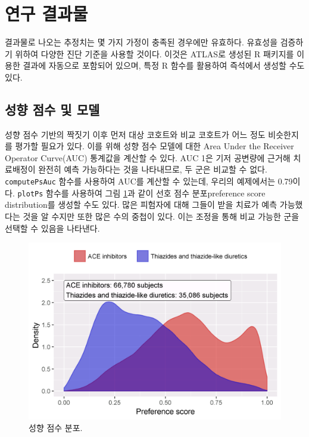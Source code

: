 \documentclass[10.5pt]{book}
\theoremstyle{definition}
\theoremstyle{definition}
\theoremstyle{definition}
\theoremstyle{remark}
\begin{document}
\section{연구 결과물}\label{studyOutputs}

결과물로 나오는 추정치는 몇 가지 가정이 충족된 경우에만 유효하다.
유효성을 검증하기 위하여 다양한 진단 기준을 사용할 것이다. 이것은
ATLAS로 생성된 R 패키지를 이용한 결과에 자동으로 포함되어 있으며, 특정 R
함수를 활용하여 즉석에서 생성할 수도 있다.

\subsection{성향 점수 및 모델}\label{---}

성향 점수 기반의 짝짓기 이후 먼저 대상 코호트와 비교 코호트가 어느 정도
비슷한지를 평가할 필요가 있다. 이를 위해 성향 점수 모델에 대한 Area
Under the Receiver Operator Curve(AUC) 통계값을 계산할 수 있다. AUC 1은
기저 공변량에 근거해 치료배정이 완전히 예측 가능하다는 것을 나타내므로,
두 군은 비교할 수 없다. \texttt{computePsAuc} 함수를 사용하여 AUC를
계산할 수 있는데, 우리의 예제에서는 0.79이다. \texttt{plotPs} 함수를
사용하여 그림 \ref{fig:ps}과 같이 선호 점수 분포preference score
distribution를 생성할 수도 있다. 많은 피험자에 대해 그들이 받을 치료가
예측 가능했다는 것을 알 수지만 또한 많은 수의 중첩이 있다. 이는 조정을
통해 비교 가능한 군을 선택할 수 있음을 나타낸다.

\begin{figure}

{\centering \includegraphics[width=0.8\linewidth]{images/PopulationLevelEstimation/ps} 

}

\caption{성향 점수 분포.}\label{fig:ps}
\end{figure}
\end{document}
